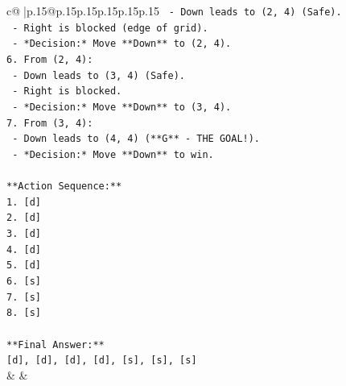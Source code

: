 \documentclass{article}
\begin{document}
{\begin{supertabular}{c@{$\;$}|p{.15\linewidth}@{}p{.15\linewidth}p{.15\linewidth}p{.15\linewidth}p{.15\linewidth}p{.15\linewidth}}
{{{\texttt{    {-}   Down leads to (2, 4) (Safe).} \\
\texttt{    {-}   Right is blocked (edge of grid).} \\
\texttt{    {-}   *Decision:* Move **Down** to (2, 4).} \\
\texttt{6.  From (2, 4):} \\
\texttt{    {-}   Down leads to (3, 4) (Safe).} \\
\texttt{    {-}   Right is blocked.} \\
\texttt{    {-}   *Decision:* Move **Down** to (3, 4).} \\
\texttt{7.  From (3, 4):} \\
\texttt{    {-}   Down leads to (4, 4) (**G** {-} THE GOAL!).} \\
\texttt{    {-}   *Decision:* Move **Down** to win.} \\
\\ 
\texttt{**Action Sequence:**} \\
\texttt{1.  {[}d{]}} \\
\texttt{2.  {[}d{]}} \\
\texttt{3.  {[}d{]}} \\
\texttt{4.  {[}d{]}} \\
\texttt{5.  {[}d{]}} \\
\texttt{6.  {[}s{]}} \\
\texttt{7.  {[}s{]}} \\
\texttt{8.  {[}s{]}} \\
\\ 
\texttt{**Final Answer:**} \\
\texttt{{[}d{]}, {[}d{]}, {[}d{]}, {[}d{]}, {[}s{]}, {[}s{]}, {[}s{]}} \\
            }
        }
    }
    & & \\ \\


\end{supertabular}}
\end{document}
